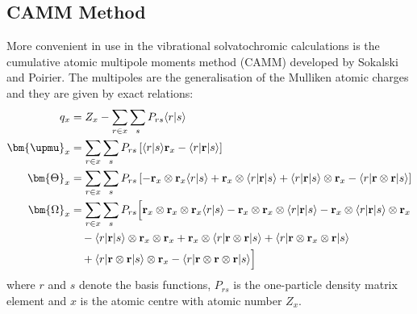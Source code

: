 \documentclass[b5paper,oneside,fleqn,11pt]{book}
\begin{document}
\begin{appendices}
\begin{refsection}
\section{CAMM Method}

More convenient in use in the vibrational solvatochromic calculations
is the cumulative atomic multipole
moments method (CAMM) developed by Sokalski and Poirier. \citep{Sokalski.Poirier.CPL.1983}
The multipoles are the generalisation of the Mulliken atomic charges
and they are given by exact relations:
%
\begin{subequations}
\begin{align}
q_x              &=Z_x -\sum_{r\in x} \sum_s  P_{rs} \langle r \rvert s \rangle \\
\bm{\upmu}_x     &= \sum_{r\in x} \sum_s  P_{rs} 
\left[
        \langle r \rvert s \rangle {\bf r}_x - \langle r \lvert {\bf r} \rvert s \rangle
\right]   \\
\bm{\Theta}_{x}  &= \sum_{r\in x} \sum_s P_{rs}
\left[
   - {\bf r}_x \otimes {\bf r}_x \langle r \rvert s \rangle +
    {\bf r}_x \otimes  \langle r \lvert {\bf r} \rvert s \rangle + 
                       \langle r \lvert {\bf r} \rvert s \rangle \otimes {\bf r}_x -
    \langle r \lvert {\bf r} \otimes {\bf r} \rvert s \rangle
\right]   \\
\bm{\Omega}_{x}  &=
\sum_{r\in x} \sum_s P_{rs}
\Big[
          {\bf r}_x \otimes {\bf r}_x \otimes {\bf r}_x \langle r \rvert s \rangle -
          {\bf r}_x \otimes {\bf r}_x \otimes \langle r \lvert {\bf r} \rvert s \rangle -
          {\bf r}_x \otimes \langle r \lvert {\bf r} \rvert s \rangle \otimes {\bf r}_x \nonumber \\ 
 &\quad- \langle r \lvert {\bf r} \rvert s \rangle \otimes {\bf r}_x \otimes {\bf r}_x +
          {\bf r}_x \otimes \langle r \lvert {\bf r} \otimes {\bf r} \rvert s \rangle +
          \langle r \lvert {\bf r} \otimes {\bf r}_x \otimes {\bf r} \rvert s \rangle \nonumber \\
 &\quad+  \langle r \lvert {\bf r} \otimes {\bf r} \rvert s \rangle \otimes {\bf r}_x 
       - \langle r \lvert {\bf r} \otimes {\bf r} \otimes {\bf r} \rvert s \rangle
\Big] 
\end{align}
\end{subequations}
%
where $r$ and $s$ denote the basis functions, $P_{rs}$ is the
one\hyp{}particle density matrix element and $x$ is the atomic centre
with atomic number $Z_x$.

\end{refsection}
\end{appendices}
\end{document}
